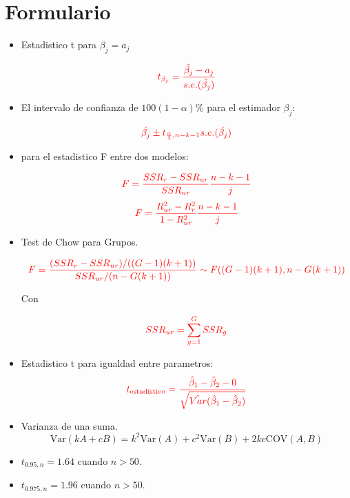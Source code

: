 \documentclass[10pt,a4paper]{article}
\begin{document}
 
\section*{Formulario}
\begin{itemize}

\item Estadistico t para $\beta_j = a_j$

$$\color{red}{t_{\beta_j}=\frac{\hat{\beta_j}-a_j}{s.e.(\hat{\beta_j})}}$$

\item El intervalo de confianza de $100(1-\alpha)\%$ para el estimador $\beta_j$:

$${\color{red}\hat{\beta_j} \pm t_{\frac{\alpha}{2},n-k-1}s.e.(\hat{\beta_j})}$$


\item para el estadistico F entre dos modelos:

$$\color{red}{F=\frac{SSR_r-SSR_{ur}}{SSR_{ur}}\frac{n-k-1}{j}}$$
$$\color{red}{F=\frac{R^2_{ur}-R^2_{r}}{1-R^2_{ur}}\frac{n-k-1}{j}}$$

\item Test de Chow para Grupos.

    \[\color{red}
    F = \frac{(SSR_r - SSR_{ur}) / ((G - 1)(k + 1))}{SSR_{ur} / (n - G(k + 1))} \sim F((G - 1)(k + 1), n - G(k + 1))
    \]

Con

$$\color{red}SSR_{ur} = \sum_{g=1}^G SSR_g$$

\item Estadistico t para igualdad entre parametros:
 \[\color{red}t_{\text{estadístico}} = \frac{\hat{\beta}_1 - \hat{\beta}_2 - 0}{\sqrt{\hat{Var}(\hat{\beta}_1 - \hat{\beta}_2)}}\]


\item  Varianza de una suma.
{\color{red}
$$\text{Var}(kA + cB) = k^2\text{Var}(A) + c^2\text{Var}(B) + 2kc\text{COV}(A, B)$$}

\item $t_{0.95,n} = 1.64$ cuando $n >50$.
\item $t_{0.975,n} = 1.96$ cuando $n >50$.



\end{itemize}
\end{document}
